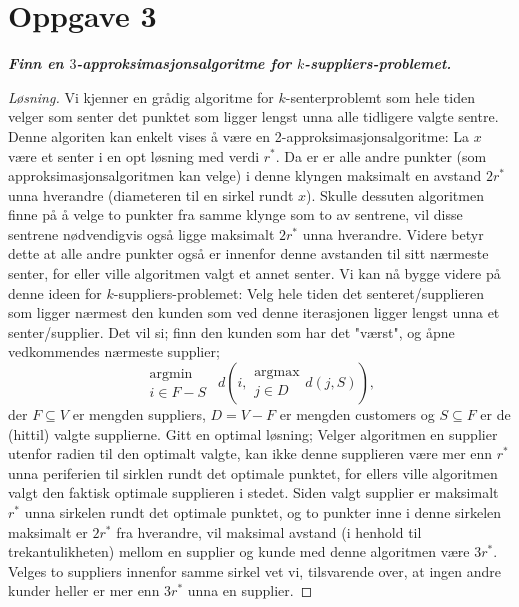\documentclass[12pt]{article}
\newenvironment{solution}{\begin{proof}[Løsning]}{\end{proof}}
\begin{document}
\section{Oppgave 3}
\it{\textbf{Finn en $3$-approksimasjonsalgoritme for $k$-suppliers-problemet.}}
\begin{solution}
Vi kjenner en grådig algoritme for $k$-senterproblemt som hele tiden velger som senter det punktet som ligger lengst unna alle tidligere valgte sentre. Denne algoriten kan enkelt vises å være en 2-approksimasjonsalgoritme: La $x$ være et senter i en opt løsning med verdi $r^*$. Da er er alle andre punkter (som approksimasjonsalgoritmen kan velge) i denne klyngen maksimalt en avstand $2r^*$ unna hverandre (diameteren til en sirkel rundt $x$). Skulle dessuten algoritmen finne på å velge to punkter fra samme klynge som to av sentrene, vil disse sentrene nødvendigvis også ligge maksimalt $2r^*$ unna hverandre. Videre betyr dette at alle andre punkter også er innenfor denne avstanden til sitt nærmeste senter, for eller ville algoritmen valgt et annet senter. Vi kan nå bygge videre på denne ideen for $k$-suppliers-problemet: Velg hele tiden det senteret/supplieren som ligger nærmest den kunden som ved denne iterasjonen ligger lengst unna et senter/supplier. Det vil si; finn den kunden som har det "værst", og åpne vedkommendes nærmeste supplier;
\begin{equation*}
\begin{matrix}
\textrm{argmin} \\
i \in F-S
\end{matrix}
~~d\left(i, \begin{matrix}
\textrm{argmax} \\ j \in D
\end{matrix} d(j, S)\right),
\end{equation*}
der $F \subseteq V$ er mengden suppliers, $D=V-F$ er mengden customers og $S \subseteq F$ er de (hittil) valgte supplierne. Gitt en optimal løsning; Velger algoritmen en supplier utenfor radien til den optimalt valgte, kan ikke denne supplieren være mer enn $r^*$ unna periferien til sirklen rundt det optimale punktet, for ellers ville algoritmen valgt den faktisk optimale supplieren i stedet. Siden valgt supplier er maksimalt $r^*$ unna sirkelen rundt det optimale punktet, og to punkter inne i denne sirkelen maksimalt er $2r^*$ fra hverandre, vil maksimal avstand (i henhold til trekantulikheten) mellom en supplier og kunde med denne algoritmen være $3r^*$. Velges to suppliers innenfor samme sirkel vet vi, tilsvarende over, at ingen andre kunder heller er mer enn $3r^*$ unna en supplier.
\end{solution}
\end{document}
